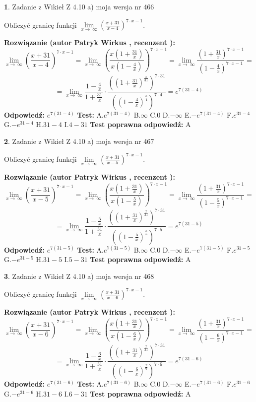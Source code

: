 \documentclass[12pt, a4paper]{article}
\theoremstyle{definition} %
\newtheorem{zad}{}
\newcommand{\zadStart}[1]{\begin{zad}#1\newline}
\newcommand{\zadStop}{\end{zad}}
\newcommand{\rozwStart}[2]{\noindent \textbf{Rozwiązanie (autor #1 , recenzent #2): }\newline}
\newcommand{\rozwStop}{\newline}
\newcommand{\odpStart}{\noindent \textbf{Odpowiedź:}\newline}
\newcommand{\odpStop}{\newline}
\newcommand{\testStart}{\noindent \textbf{Test:}\newline}
\newcommand{\testStop}{\newline}
\newcommand{\kluczStart}{\noindent \textbf{Test poprawna odpowiedź:}\newline}
\newcommand{\kluczStop}{\newline}
\begin{document}
\zadStart{Zadanie z Wikieł Z 4.10 a) moja wersja nr 466}


Obliczyć granicę funkcji  $\lim\limits_{x\to\ \infty}(\frac{x+31}{x-4})^{7\cdot x-1}$.
\zadStop
\rozwStart{Patryk Wirkus}{}
$$\lim\limits_{x\to\ \infty}(\frac{x+31}{x-4})^{7\cdot x-1} = \lim\limits_{x\to\ \infty}(\frac{x(1+\frac{31}{x})}{x(1-\frac{4}{x})})^{7\cdot x-1}=\lim\limits_{x\to\ \infty}\frac{(1+\frac{31}{x})^{7\cdot x-1}}{(1-\frac{4}{x})^{7\cdot x-1}}=$$
$$=\lim\limits_{x\to\ \infty}\frac{1-\frac{4}{x}}{1+\frac{31}{x}}\cdot\frac{((1+\frac{31}{x})^{\frac{x}{31}})^{7\cdot31}}{((1-\frac{4}{x})^{\frac{x}{4}})^{7\cdot4}}=e^{7(31-4)}$$
\rozwStop
\odpStart
$e^{7(31-4)}$
\odpStop
\testStart
A.$e^{7(31-4)}$ B.$\infty$ C.$0$ D.$-\infty$ E.$-e^{7(31-4)}$
F.$e^{31-4}$ G.$-e^{31-4}$
H.$31-4$
I.$4-31$
\testStop
\kluczStart
A
\kluczStop



\zadStart{Zadanie z Wikieł Z 4.10 a) moja wersja nr 467}


Obliczyć granicę funkcji  $\lim\limits_{x\to\ \infty}(\frac{x+31}{x-5})^{7\cdot x-1}$.
\zadStop
\rozwStart{Patryk Wirkus}{}
$$\lim\limits_{x\to\ \infty}(\frac{x+31}{x-5})^{7\cdot x-1} = \lim\limits_{x\to\ \infty}(\frac{x(1+\frac{31}{x})}{x(1-\frac{5}{x})})^{7\cdot x-1}=\lim\limits_{x\to\ \infty}\frac{(1+\frac{31}{x})^{7\cdot x-1}}{(1-\frac{5}{x})^{7\cdot x-1}}=$$
$$=\lim\limits_{x\to\ \infty}\frac{1-\frac{5}{x}}{1+\frac{31}{x}}\cdot\frac{((1+\frac{31}{x})^{\frac{x}{31}})^{7\cdot31}}{((1-\frac{5}{x})^{\frac{x}{5}})^{7\cdot5}}=e^{7(31-5)}$$
\rozwStop
\odpStart
$e^{7(31-5)}$
\odpStop
\testStart
A.$e^{7(31-5)}$ B.$\infty$ C.$0$ D.$-\infty$ E.$-e^{7(31-5)}$
F.$e^{31-5}$ G.$-e^{31-5}$
H.$31-5$
I.$5-31$
\testStop
\kluczStart
A
\kluczStop



\zadStart{Zadanie z Wikieł Z 4.10 a) moja wersja nr 468}


Obliczyć granicę funkcji  $\lim\limits_{x\to\ \infty}(\frac{x+31}{x-6})^{7\cdot x-1}$.
\zadStop
\rozwStart{Patryk Wirkus}{}
$$\lim\limits_{x\to\ \infty}(\frac{x+31}{x-6})^{7\cdot x-1} = \lim\limits_{x\to\ \infty}(\frac{x(1+\frac{31}{x})}{x(1-\frac{6}{x})})^{7\cdot x-1}=\lim\limits_{x\to\ \infty}\frac{(1+\frac{31}{x})^{7\cdot x-1}}{(1-\frac{6}{x})^{7\cdot x-1}}=$$
$$=\lim\limits_{x\to\ \infty}\frac{1-\frac{6}{x}}{1+\frac{31}{x}}\cdot\frac{((1+\frac{31}{x})^{\frac{x}{31}})^{7\cdot31}}{((1-\frac{6}{x})^{\frac{x}{6}})^{7\cdot6}}=e^{7(31-6)}$$
\rozwStop
\odpStart
$e^{7(31-6)}$
\odpStop
\testStart
A.$e^{7(31-6)}$ B.$\infty$ C.$0$ D.$-\infty$ E.$-e^{7(31-6)}$
F.$e^{31-6}$ G.$-e^{31-6}$
H.$31-6$
I.$6-31$
\testStop
\kluczStart
A
\kluczStop
\end{document}
